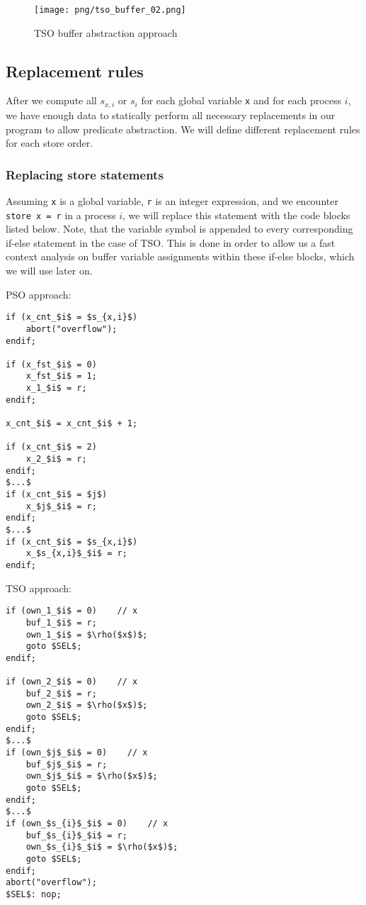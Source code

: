 \begin{figure}[h]

	\caption{TSO buffer abstraction approach}
	\centering
	\texttt{[image: png/tso\_buffer\_02.png]}

\end{figure}

\FloatBarrier

\subsection{Replacement rules}

After we compute all $s_{x,i}$ or $s_{i}$ for each global variable \lstinline$x$ and for each process $i$, we have enough data to statically perform all necessary replacements in our program to allow predicate abstraction. We will define different replacement rules for each store order.

\subsubsection{Replacing store statements}

Assuming \lstinline$x$ is a global variable, \lstinline$r$ is an integer expression, and we encounter \lstinline$store x = r$ in a process $i$, we will replace this statement with the code blocks listed below. Note, that the variable symbol is appended to every corresponding if-else statement in the case of TSO. This is done in order to allow us a fast context analysis on buffer variable assignments within these if-else blocks, which we will use later on.

\begin{multicols}{2}

PSO approach:

\begin{lstlisting}[frame=single, mathescape]
if (x_cnt_$i$ = $s_{x,i}$)
	abort("overflow");
endif;

if (x_fst_$i$ = 0)
	x_fst_$i$ = 1;
	x_1_$i$ = r;
endif;

x_cnt_$i$ = x_cnt_$i$ + 1; 

if (x_cnt_$i$ = 2)
	x_2_$i$ = r;
endif;
$...$
if (x_cnt_$i$ = $j$)
	x_$j$_$i$ = r;
endif;
$...$
if (x_cnt_$i$ = $s_{x,i}$)
	x_$s_{x,i}$_$i$ = r;
endif;
\end{lstlisting}

\columnbreak

TSO approach:

\begin{lstlisting}[frame=single, mathescape]
if (own_1_$i$ = 0)    // x
    buf_1_$i$ = r;
    own_1_$i$ = $\rho($x$)$;
    goto $SEL$;
endif;

if (own_2_$i$ = 0)    // x
    buf_2_$i$ = r;
    own_2_$i$ = $\rho($x$)$;
    goto $SEL$;
endif;
$...$
if (own_$j$_$i$ = 0)    // x
    buf_$j$_$i$ = r;
    own_$j$_$i$ = $\rho($x$)$;
    goto $SEL$;
endif;
$...$
if (own_$s_{i}$_$i$ = 0)    // x
    buf_$s_{i}$_$i$ = r;
    own_$s_{i}$_$i$ = $\rho($x$)$;
    goto $SEL$;
endif;
abort("overflow");
$SEL$: nop;
\end{lstlisting}

\end{multicols}

